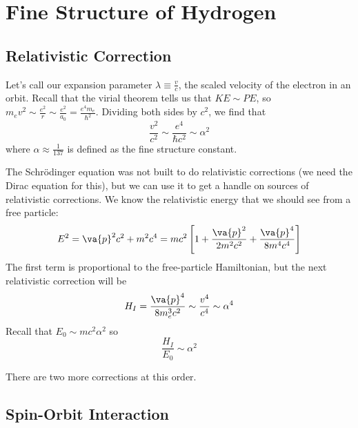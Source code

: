 \documentclass[a4paper,twoside,master.tex]{subfiles}
\begin{document}

\section{Fine Structure of Hydrogen}
\label{sec:fine_structure_of_hydrogen}

\subsection{Relativistic Correction}
\label{sub:relativistic_correction}

Let's call our expansion parameter $ \lambda \equiv \frac{v}{c} $, the scaled velocity of the electron in an orbit. Recall that the virial theorem tells us that $ KE \sim PE $, so $ m_e v^2 \sim \frac{e^2}{r} \sim \frac{e^2}{a_0} = \frac{e^4 m_e}{\hbar^2} $. Dividing both sides by $ c^2 $, we find that
\begin{equation}
    \frac{v^2}{c^2} \sim \frac{e^4}{\hbar c^2} \sim \alpha^2
\end{equation}
where $ \alpha \approx \frac{1}{137} $ is defined as the fine structure constant.

The Schr\"odinger equation was not built to do relativistic corrections (we need the Dirac equation for this), but we can use it to get a handle on sources of relativistic corrections. We know the relativistic energy that we should see from a free particle:
\begin{equation}
    E^2 = \va{p}^2 c^2 + m^2 c^4 = m c^2 \left[ 1 + \frac{\va{p}^2}{2 m^2 c^2} + \frac{\va{p}^4}{8 m^4 c^4} \right]
\end{equation}
The first term is proportional to the free-particle Hamiltonian, but the next relativistic correction will be
\begin{equation}
    H_I = \frac{\va{p}^4}{8 m_e^3 c^2} \sim \frac{v^4}{c^4} \sim \alpha^4
\end{equation}
Recall that $ E_0 \sim m c^2 \alpha^2 $ so
\begin{equation}
    \frac{H_I}{E_0} \sim \alpha^2
\end{equation}

There are two more corrections at this order.

\subsection{Spin-Orbit Interaction}
\label{sub:spin-orbit_interaction}
\end{document}
